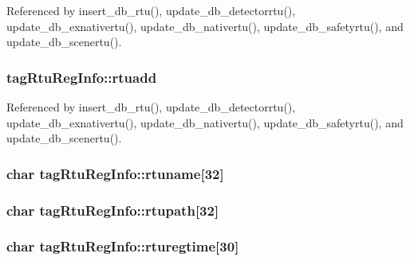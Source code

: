 Referenced by insert\-\_\-db\-\_\-rtu(), update\-\_\-db\-\_\-detectorrtu(), update\-\_\-db\-\_\-exnativertu(), update\-\_\-db\-\_\-nativertu(), update\-\_\-db\-\_\-safetyrtu(), and update\-\_\-db\-\_\-scenertu().

\hypertarget{structtagRtuRegInfo_ad7e659c7f3dd0462c30300d144c87b4d}{
\subsubsection[{rtuadd}]{ tag\-Rtu\-Reg\-Info\-::rtuadd}}\label{structtagRtuRegInfo_ad7e659c7f3dd0462c30300d144c87b4d}


Referenced by insert\-\_\-db\-\_\-rtu(), update\-\_\-db\-\_\-detectorrtu(), update\-\_\-db\-\_\-exnativertu(), update\-\_\-db\-\_\-nativertu(), update\-\_\-db\-\_\-safetyrtu(), and update\-\_\-db\-\_\-scenertu().

\hypertarget{structtagRtuRegInfo_a9861a6ba54a15e0855d30e48035717b8}{
\subsubsection[{rtuname}]{\setlength{\rightskip}{0pt plus 5cm}char tag\-Rtu\-Reg\-Info\-::rtuname\mbox{[}32\mbox{]}}}\label{structtagRtuRegInfo_a9861a6ba54a15e0855d30e48035717b8}
\hypertarget{structtagRtuRegInfo_a5747ec6866797567cf13966b2a078c37}{
\subsubsection[{rtupath}]{\setlength{\rightskip}{0pt plus 5cm}char tag\-Rtu\-Reg\-Info\-::rtupath\mbox{[}32\mbox{]}}}\label{structtagRtuRegInfo_a5747ec6866797567cf13966b2a078c37}
\hypertarget{structtagRtuRegInfo_aa1fd796448e107b30b0e98489260182b}{
\subsubsection[{rturegtime}]{\setlength{\rightskip}{0pt plus 5cm}char tag\-Rtu\-Reg\-Info\-::rturegtime\mbox{[}30\mbox{]}}}\label{structtagRtuRegInfo_aa1fd796448e107b30b0e98489260182b}


